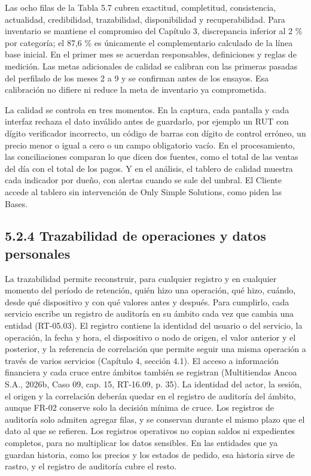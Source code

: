 \documentclass[11pt]{article}
\begin{document}
Las ocho filas de la Tabla 5.7 cubren exactitud, completitud, consistencia, actualidad, credibilidad, trazabilidad, disponibilidad y recuperabilidad. Para inventario se mantiene el compromiso del Capítulo 3, discrepancia inferior al 2 \% por categoría; el 87,6 \% es únicamente el complementario calculado de la línea base inicial. En el primer mes se acuerdan responsables, definiciones y reglas de medición. Las metas adicionales de calidad se calibran con las primeras pasadas del perfilado de los meses 2 a 9 y se confirman antes de los ensayos. Esa calibración no difiere ni reduce la meta de inventario ya comprometida.

La calidad se controla en tres momentos. En la captura, cada pantalla y cada interfaz rechaza el dato inválido antes de guardarlo, por ejemplo un RUT con dígito verificador incorrecto, un código de barras con dígito de control erróneo, un precio menor o igual a cero o un campo obligatorio vacío. En el procesamiento, las conciliaciones comparan lo que dicen dos fuentes, como el total de las ventas del día con el total de los pagos. Y en el análisis, el tablero de calidad muestra cada indicador por dueño, con alertas cuando se sale del umbral. El Cliente accede al tablero sin intervención de Only Simple Solutions, como piden las Bases.

\subsection{5.2.4 Trazabilidad de operaciones y datos personales}

La trazabilidad permite reconstruir, para cualquier registro y en cualquier momento del período de retención, quién hizo una operación, qué hizo, cuándo, desde qué dispositivo y con qué valores antes y después. Para cumplirlo, cada servicio escribe un registro de auditoría en su ámbito cada vez que cambia una entidad (RT-05.03). El registro contiene la identidad del usuario o del servicio, la operación, la fecha y hora, el dispositivo o nodo de origen, el valor anterior y el posterior, y la referencia de correlación que permite seguir una misma operación a través de varios servicios (Capítulo 4, sección 4.1). El acceso a información financiera y cada cruce entre ámbitos también se registran (Multitiendas Ancoa S.A., 2026b, Caso 09, cap. 15, RT-16.09, p. 35). La identidad del actor, la sesión, el origen y la correlación deberán quedar en el registro de auditoría del ámbito, aunque FR-02 conserve solo la decisión mínima de cruce. Los registros de auditoría solo admiten agregar filas, y se conservan durante el mismo plazo que el dato al que se refieren. Los registros operativos no copian saldos ni expedientes completos, para no multiplicar los datos sensibles. En las entidades que ya guardan historia, como los precios y los estados de pedido, esa historia sirve de rastro, y el registro de auditoría cubre el resto.
\end{document}
